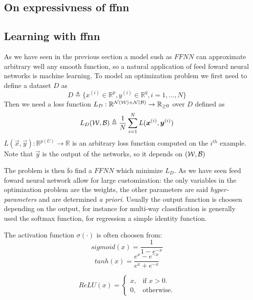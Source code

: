 \subsection{On expressivness of ffnn}
\subsection{Learning with ffnn}

As we have seen in the previous section a model sush as $FFNN$ can approximate arbitrary well any smooth function, so a natural application of feed foward neural networks is machine learning.
To model an optimization problem we first need to define a dataset $D$ as 
\begin{equation}
D\triangleq\{x^{(i)} \in \mathbb{R}^p, y^{(i)} \in \mathbb{R}^q,  i=1,...,N\}
\end{equation}
Then we need a loss function $L_D:\mathbb{R}^{\mathcal{N}(\mathcal{W})+\mathcal{N}(\mathcal{B})} \rightarrow \mathbb{R}_{\geq 0}$ over $D$ defined as
\begin{equation}
L_D(\mathcal{W},\mathcal{B})\triangleq\frac{1}{N}\sum_{i=1}^N L(\boldsymbol{x}^{(i)},\boldsymbol{y}^{(i)}) 
\end{equation}
$L(\vec{x},\vec{y}):\mathbb{R}^{p(U)} \rightarrow \mathbb{R}$ is an arbitrary loss function computed on the $i^{th}$ example. Note that $\vec{y}$ is the output of the
networks, so it depends on $(\mathcal{W},\mathcal{B})$


The problem is then fo find a $FFNN$ which minimize $L_D$. As we have seen feed foward neural network allow for large customization: the only variables in the optimization problem are the weights, the other
parameters are said \textit{hyper-parameters} and are determined \textit{a priori}. Usually the output function is choosen depending on the output, for instance for multi-way classification
is generally used the softmax function, for regression a simple identity function.

The activation function $\sigma(\cdot)$ is often choosen from:
\begin{equation}
 sigmoid(x)=\frac{1}{1-e^{-x}}
\end{equation}
\begin{equation}
 tanh(x)=\frac{e^x-e^{-x}}{e^x+e^{-x}}
\end{equation}

\begin{equation}
  ReLU(x)=\begin{cases}
    x, & \text{if $x>0$}.\\
    0, & \text{otherwise}.
  \end{cases}
\end{equation}

